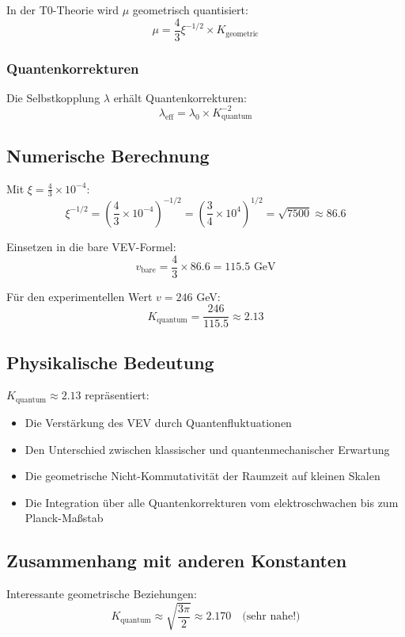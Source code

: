 \documentclass[12pt,a4paper]{article}
\begin{document}
	In der T0-Theorie wird $\mu$ geometrisch quantisiert:
	\[
	\mu = \frac{4}{3} \xi^{-1/2} \times K_{\text{geometric}}
	\]
	
	\subsubsection{Quantenkorrekturen}
	
	Die Selbstkopplung $\lambda$ erhält Quantenkorrekturen:
	\[
	\lambda_{\text{eff}} = \lambda_0 \times K_{\text{quantum}}^{-2}
	\]
	
	\subsection{Numerische Berechnung}
	
	Mit $\xi = \frac{4}{3} \times 10^{-4}$:
	\[
	\xi^{-1/2} = \left(\frac{4}{3} \times 10^{-4}\right)^{-1/2} = \left(\frac{3}{4} \times 10^{4}\right)^{1/2} = \sqrt{7500} \approx 86.6
	\]
	
	Einsetzen in die bare VEV-Formel:
	\[
	v_{\text{bare}} = \frac{4}{3} \times 86.6 = 115.5 \text{ GeV}
	\]
	
	Für den experimentellen Wert $v = 246$ GeV:
	\[
	K_{\text{quantum}} = \frac{246}{115.5} \approx 2.13
	\]
	
	\subsection{Physikalische Bedeutung}
	
	$K_{\text{quantum}} \approx 2.13$ repräsentiert:
	\begin{itemize}
		\item Die Verstärkung des VEV durch Quantenfluktuationen
		\item Den Unterschied zwischen klassischer und quantenmechanischer Erwartung
		\item Die geometrische Nicht-Kommutativität der Raumzeit auf kleinen Skalen
		\item Die Integration über alle Quantenkorrekturen vom elektroschwachen bis zum Planck-Maßstab
	\end{itemize}
	
	\subsection{Zusammenhang mit anderen Konstanten}
	
	Interessante geometrische Beziehungen:
	\[
	K_{\text{quantum}} \approx \sqrt{\frac{3\pi}{2}} \approx 2.170 \quad \text{(sehr nahe!)}
	\]
	
\end{document}
